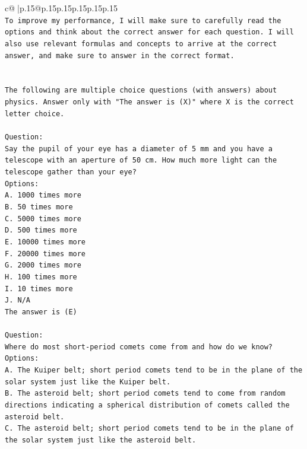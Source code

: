 \documentclass{article}
\begin{document}
{\begin{supertabular}{c@{$\;$}|p{.15\linewidth}@{}p{.15\linewidth}p{.15\linewidth}p{.15\linewidth}p{.15\linewidth}p{.15\linewidth}}
{{{\\ 
\texttt{To improve my performance, I will make sure to carefully read the options and think about the correct answer for each question. I will also use relevant formulas and concepts to arrive at the correct answer, and make sure to answer in the correct format.} \\
\\ 
\\ 
\texttt{The following are multiple choice questions (with answers) about physics. Answer only with "The answer is (X)" where X is the correct letter choice.} \\
\\ 
\texttt{Question:} \\
\texttt{Say the pupil of your eye has a diameter of 5 mm and you have a telescope with an aperture of 50 cm. How much more light can the telescope gather than your eye?} \\
\texttt{Options:} \\
\texttt{A. 1000 times more} \\
\texttt{B. 50 times more} \\
\texttt{C. 5000 times more} \\
\texttt{D. 500 times more} \\
\texttt{E. 10000 times more} \\
\texttt{F. 20000 times more} \\
\texttt{G. 2000 times more} \\
\texttt{H. 100 times more} \\
\texttt{I. 10 times more} \\
\texttt{J. N/A} \\
\texttt{The answer is (E)} \\
\\ 
\texttt{Question:} \\
\texttt{Where do most short{-}period comets come from and how do we know?} \\
\texttt{Options:} \\
\texttt{A. The Kuiper belt; short period comets tend to be in the plane of the solar system just like the Kuiper belt.} \\
\texttt{B. The asteroid belt; short period comets tend to come from random directions indicating a spherical distribution of comets called the asteroid belt.} \\
\texttt{C. The asteroid belt; short period comets tend to be in the plane of the solar system just like the asteroid belt.} \\
}}}
\end{supertabular}}
\end{document}
